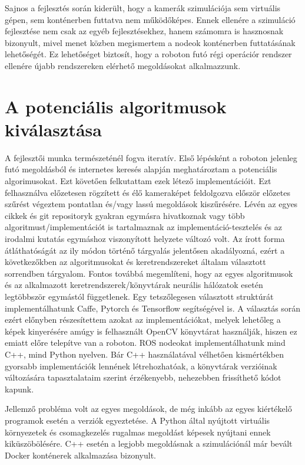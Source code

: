 Sajnos a fejlesztés során kiderült, hogy a kamerák szimulációja sem virtuális gépen, sem konténerben futtatva nem működőképes. Ennek ellenére a szimuláció fejlesztése nem csak az egyéb fejlesztésekhez, hanem számomra is hasznosnak bizonyult, mivel menet közben megismertem a nodeok konténerben futtatásának lehetőségét. Ez lehetőséget biztosít, hogy a roboton futó régi operációr rendszer ellenére újabb rendszereken elérhető megoldásokat alkalmazzunk.

\chapter{A potenciális algoritmusok kiválasztása}

A fejlesztői munka természeténél fogva iteratív. Első lépésként a roboton jelenleg futó megoldásból és internetes keresés alapján meghatároztam a potenciális algorimusokat. Ezt követően felkutattam ezek létező implementációit. Ezt felhasználva előzetesen rögzített és élő kameraképet feldolgozva először előzetes szűrést végeztem pontatlan és/vagy lassú megoldások kiszűrésére. Lévén az egyes cikkek és git repositoryk gyakran egymásra hivatkoznak vagy több algoritmust/implementációt is tartalmaznak az implementáció-tesztelés és az irodalmi kutatás egymáshoz viszonyított helyzete változó volt. Az írott forma átláthatóságát az ily módon történő tárgyalás jelentősen akadályozná, ezért a következőkben az algoritmusokat és keretrendszereket általam választott sorrendben tárgyalom. Fontos továbbá megemlíteni, hogy az egyes algoritmusok és az alkalmazott keretrendszerek/könyvtárak neurális hálózatok esetén legtöbbször egymástól függetlenek. Egy tetszőlegesen választott struktúrát implementálhatunk Caffe, Pytorch és Tensorflow segítségével is. A választás során ezért előnyben részesítettem azokat az implementációkat, melyek lehetőleg a képek kinyerésére amúgy is felhasznált OpenCV könyvtárat használják, hiszen ez emiatt előre telepítve van a roboton. ROS nodeokat implementálhatunk mind C++, mind Python nyelven. Bár C++ használatával vélhetően kismértékben gyorsabb implementációk lennének létrehozhatóak, a könyvtárak verzióinak változására tapasztalataim szerint érzékenyebb, nehezebben frissíthető kódot kapunk.

Jellemző probléma volt az egyes megoldások, de még inkább az egyes kiértékelő programok esetén a verziók egyeztetése. A Python által nyújtott virtuális környezetek és csomagkezelés rugalmas megoldást képesek nyújtani ennek kiküszöbölésére. C++ esetén a legjobb megoldásnak a szimulációnál már bevált Docker konténerek alkalmazása bizonyult.

